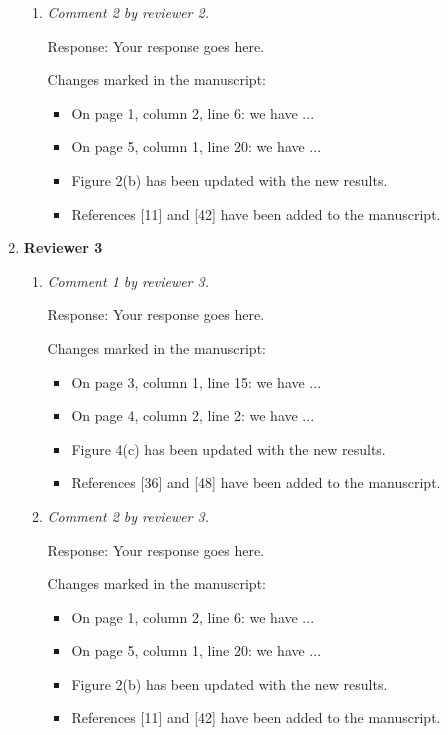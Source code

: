 \documentclass[12pt]{article}
\begin{document}
\begin{enumerate}
\begin{enumerate}
  \item \textit{Comment 2 by reviewer 2.}
    
    Response: Your response goes here.
    
    Changes marked in the manuscript:
    
    \begin{itemize}
    \item On page 1, column 2, line 6: we have ...
    \item On page 5, column 1, line 20: we have ...
    \item Figure 2(b) has been updated with the new results.
    \item References [11] and [42] have been added to the manuscript.
    \end{itemize}
  \end{enumerate}
  
\item \textbf{Reviewer 3} %
  \begin{enumerate}
  \item \textit{Comment 1 by reviewer 3.}
    
    Response: Your response goes here.

    Changes marked in the manuscript:

    \begin{itemize}
    \item On page 3, column 1, line 15: we have ...
    \item On page 4, column 2, line 2: we have ...
    \item Figure 4(c) has been updated with the new results.
    \item References [36] and [48] have been added to the manuscript.
    \end{itemize}

  \item \textit{Comment 2 by reviewer 3.}

    Response: Your response goes here.

    Changes marked in the manuscript:

    \begin{itemize}
    \item On page 1, column 2, line 6: we have ...
    \item On page 5, column 1, line 20: we have ...
    \item Figure 2(b) has been updated with the new results.
    \item References [11] and [42] have been added to the manuscript.
    \end{itemize}
  \end{enumerate}
  
\end{enumerate}
\end{document}
